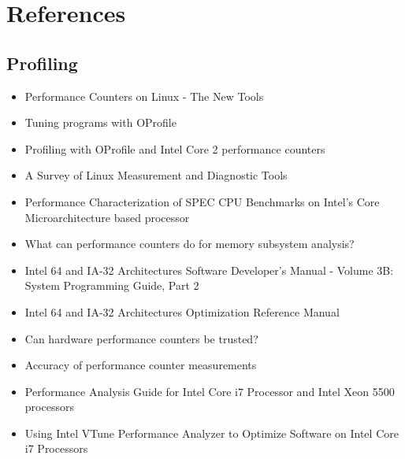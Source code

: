 \section{References}

\subsection{Profiling}

\begin{itemize}
\item[\textbullet] Performance Counters on Linux - The New Tools
  \cite{Melo2009}
\item[\textbullet] Tuning programs with OProfile \cite{Cohen2004}
\item[\textbullet] Profiling with OProfile and Intel Core 2
  performance counters \cite{Nielsen2008}
\item[\textbullet] A Survey of Linux Measurement and Diagnostic Tools
  \cite{Rowand2009}
\item[\textbullet] Performance Characterization of SPEC CPU Benchmarks
  on Intel's Core Microarchitecture based processor \cite{Bird2007}
\item[\textbullet] What can performance counters do for memory
  subsystem analysis?  \cite{Eranian2008}
\item[\textbullet] Intel \textsuperscript{\textregistered} 64 and
  IA-32 Architectures Software Developer’s Manual - Volume 3B: System
  Programming Guide, Part 2 \cite{Intel2010}
\item[\textbullet] Intel \textsuperscript{\textregistered} 64 and
  IA-32 Architectures Optimization Reference Manual \cite{Intel2009}
\item[\textbullet] Can hardware performance counters be trusted?
  \cite{Weaver2008}
\item[\textbullet] Accuracy of performance counter measurements
  \cite{Zaparanuks2008}
\item[\textbullet] Performance Analysis Guide for Intel
  \textsuperscript{\textregistered} Core
  \textsuperscript{\texttrademark} i7 Processor and Intel
  \textsuperscript{\textregistered} Xeon
  \textsuperscript{\texttrademark} 5500 processors
  \cite{Levinthal2009}
\item[\textbullet] Using Intel \textsuperscript{\textregistered} VTune
  \textsuperscript{\texttrademark} Performance Analyzer to Optimize
  Software on Intel \textsuperscript{\textregistered} Core
  \textsuperscript{\texttrademark} i7 Processors \cite{Intel2009a}
\end{itemize}

